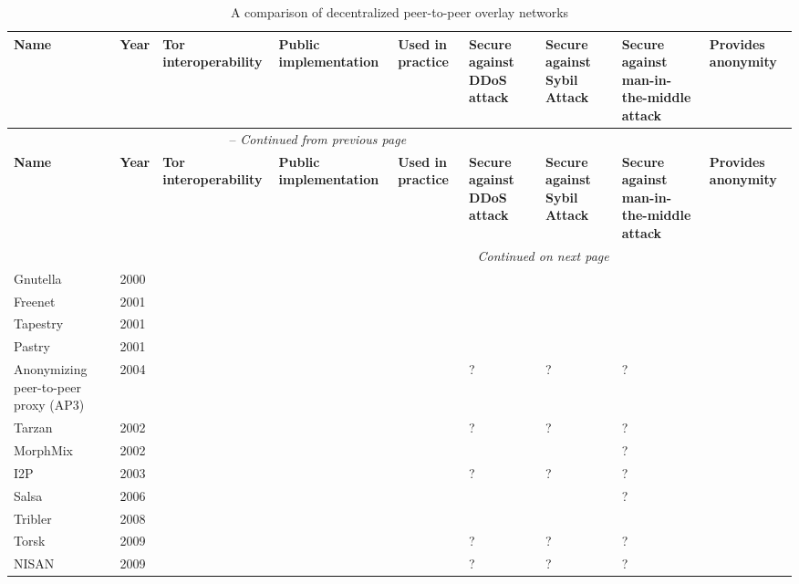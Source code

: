 \begin{center}
    \begin{longtable}{ | p{1.9cm} | p{0.8cm} | p{1.6cm} | p{2.2cm} | p{2.2cm} | p{2.5cm} | p{2.5cm} | p{2.5cm} | p{2cm} | }
  		\caption{A comparison of decentralized peer-to-peer overlay networks} \\ \hline
	    \textbf{Name} & \textbf{Year} & \textbf{Tor interoperability} & \textbf{Public implementation} & \textbf{Used in practice} & \textbf{Secure against DDoS attack} & \textbf{Secure against Sybil Attack} & \textbf{Secure against man-in-the-middle attack} & \textbf{Provides anonymity} \\ \hline
		\endfirsthead
		\multicolumn{7}{c}{\tablename\ \thetable\ -- \textit{Continued from previous page}} \\ \hline
	    \textbf{Name} & \textbf{Year} & \textbf{Tor interoperability} & \textbf{Public implementation} & \textbf{Used in practice} & \textbf{Secure against DDoS attack} & \textbf{Secure against Sybil Attack} & \textbf{Secure against man-in-the-middle attack} & \textbf{Provides anonymity} \\ \hline
		\endhead
		\hline \multicolumn{7}{r}{\textit{Continued on next page}} \\
		\endfoot
		\hline
		\endlastfoot
	    
		Gnutella & 2000 & \xmark & \checkmark & \checkmark & \xmark & \xmark & \xmark & \xmark \\ \hline
		Freenet & 2001 & \xmark & \checkmark & \checkmark & \checkmark & \xmark & \xmark & \checkmark \\ \hline
		Tapestry & 2001 & \xmark & \checkmark & \checkmark & \checkmark & \xmark & \xmark & \xmark \\ \hline
		Pastry & 2001 & \xmark & \checkmark & \checkmark & \checkmark & \xmark & \xmark & \xmark \\ \hline
		Anonymizing peer-to-peer proxy (AP3) & 2004 & \xmark & \xmark & \xmark & ? & ? & ? & \checkmark \\ \hline
		Tarzan & 2002 & \xmark & \xmark & \xmark & ? & ? & ? & \checkmark \\ \hline
		MorphMix & 2002 & \xmark & \checkmark & \xmark & \checkmark & \xmark & ? & \checkmark \\ \hline
		I2P & 2003 & \xmark & \checkmark & \checkmark & ? & ? & ? & \checkmark\\ \hline
		Salsa & 2006 & \xmark & \xmark & \xmark & \checkmark & \checkmark & ? & \checkmark \\ \hline
		Tribler & 2008 & \xmark & \checkmark & \checkmark & \checkmark & \xmark & \xmark & \xmark \\ \hline
		Torsk & 2009 & \checkmark & \xmark & \xmark & ? & ? & ? & \checkmark \\ \hline
		NISAN & 2009 & \xmark & \xmark & \xmark & ? & ? & ? & \checkmark \\ \hline
    \end{longtable}
\end{center}
